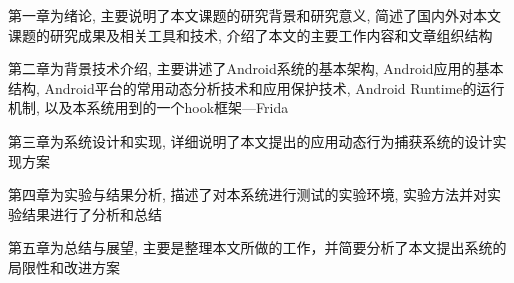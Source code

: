 第一章为绪论, 主要说明了本文课题的研究背景和研究意义, 简述了国内外对本文课题的研究成果及相关工具和技术, 介绍了本文的主要工作内容和文章组织结构\juhao 

第二章为背景技术介绍, 主要讲述了Android系统的基本架构, Android应用的基本结构, Android平台的常用动态分析技术和应用保护技术, Android Runtime的运行机制, 以及本系统用到的一个hook框架---Frida\juhao

第三章为系统设计和实现, 详细说明了本文提出的应用动态行为捕获系统的设计实现方案\juhao

第四章为实验与结果分析, 描述了对本系统进行测试的实验环境, 实验方法并对实验结果进行了分析和总结\juhao

第五章为总结与展望, 主要是整理本文所做的工作，并简要分析了本文提出系统的局限性和改进方案\juhao

 